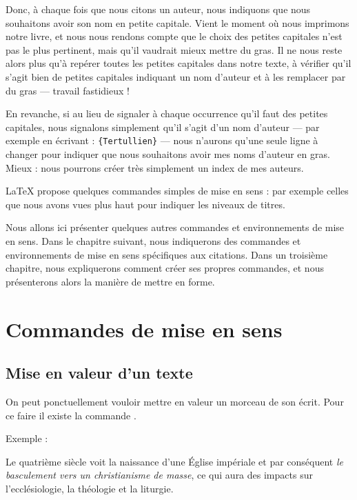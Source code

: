 Donc, à chaque fois que nous citons un auteur, nous indiquons que nous souhaitons avoir son nom en petite capitale.
Vient le moment où nous imprimons notre livre, et nous nous rendons compte que le choix des petites capitales n'est pas le plus pertinent, mais qu'il vaudrait mieux mettre du gras. Il ne nous reste alors plus qu'à repérer toutes les petites capitales dans notre texte, à vérifier qu'il s'agit bien de petites capitales indiquant un nom d'auteur et à les remplacer par du gras --- travail fastidieux !

En revanche, si au lieu de signaler à chaque occurrence qu'il faut des petites capitales, nous signalons simplement  qu'il s'agit d'un nom d'auteur --- par exemple en écrivant : \verb|{Tertullien}| --- nous n'aurons qu'une seule ligne à changer pour indiquer que nous souhaitons avoir mes noms d'auteur en gras. Mieux : nous pourrons créer très simplement un index de mes auteurs.

LaTeX propose quelques commandes simples de mise en sens  : par exemple celles que nous avons vues plus haut pour indiquer les niveaux de titres.

Nous allons ici présenter quelques autres commandes et environnements de mise en sens. Dans le chapitre suivant, nous indiquerons des commandes et environnements de mise en sens spécifiques aux citations. Dans un troisième chapitre, nous expliquerons comment créer ses propres commandes, et nous présenterons alors la manière de mettre en forme.

\section{Commandes de mise en sens}

\subsection{Mise en valeur d'un texte}

On peut ponctuellement vouloir mettre en valeur un morceau de son écrit. Pour ce faire il existe la commande .

Exemple :

\begin{latexcode}
Le quatrième siècle voit la naissance d'une Église impériale
et par conséquent \emph{le basculement vers un christianisme
de masse},
ce qui aura des impacts sur l'ecclésiologie,
la théologie et la liturgie.
\end{latexcode}

